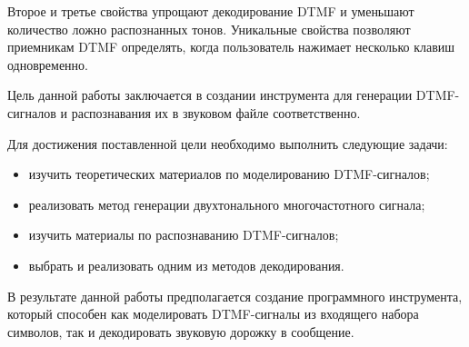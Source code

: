 Второе и третье свойства упрощают декодирование DTMF и уменьшают количество ложно распознанных тонов. Уникальные свойства позволяют приемникам DTMF определять, когда пользователь нажимает несколько клавиш одновременно.

Цель данной работы заключается в создании инструмента для генерации DTMF-сигналов и распознавания их в звуковом файле соответственно.

Для достижения поставленной цели необходимо выполнить следующие задачи:

\begin{itemize}
	\item изучить теоретических материалов по моделированию DTMF-сигналов;
	\item реализовать метод генерации двухтонального многочастотного сигнала;
	\item изучить материалы по распознаванию DTMF-сигналов;
	\item выбрать и реализовать одним из методов декодирования.
\end{itemize} 

В результате данной работы предполагается создание программного инструмента, который способен как моделировать DTMF-сигналы из входящего набора символов, так и декодировать звуковую дорожку в сообщение. 

